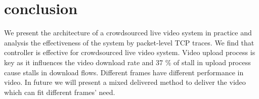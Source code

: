 
\section{conclusion}
\label{sec:conclusion}
 
 We present the architecture of a crowdsourced live video system in practice and analysis the effectiveness of the system by packet-level TCP traces. We find that controller is effective for crowdsourced live video system. Video upload process is key as it influences the video download rate and 37 \% of stall in upload process cause stalls in download flows. Different frames have different performance in video. In future we will present a mixed delivered method to deliver the video which can fit different frames' need.
 



 